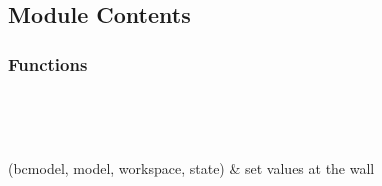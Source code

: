 \documentclass[letterpaper,10pt,english]{sphinxmanual}
\begin{document}
\subsection{Module Contents}
\label{\detokenize{autoapi/bcwall/index:module-contents}}

\subsubsection{Functions}
\label{\detokenize{autoapi/bcwall/index:functions}}

\begin{savenotes}\sphinxatlongtablestart\begin{longtable}[c]{}
\hline

\endfirsthead

%
{}\\
\hline

\endhead

\hline
{}\\
\endfoot

\endlastfoot

\sphinxAtStartPar
{\hyperref[\detokenize{autoapi/bcwall/index:bcwall.wall}]{}}(bcmodel, model, workspace, state)
&
\sphinxAtStartPar
set values at the wall
\\
\hline
\end{longtable}\sphinxatlongtableend\end{savenotes}
\end{document}
